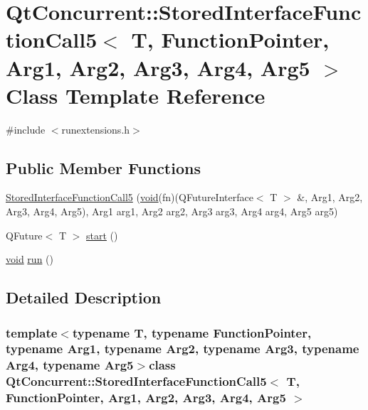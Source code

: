 \hypertarget{class_qt_concurrent_1_1_stored_interface_function_call5}{\section{\-Qt\-Concurrent\-:\-:\-Stored\-Interface\-Function\-Call5$<$ \-T, \-Function\-Pointer, \-Arg1, \-Arg2, \-Arg3, \-Arg4, \-Arg5 $>$ \-Class \-Template \-Reference}
\label{class_qt_concurrent_1_1_stored_interface_function_call5}
}


{\ttfamily \#include $<$runextensions.\-h$>$}

\subsection*{\-Public \-Member \-Functions}
\begin{DoxyCompactItemize}
\item 
\hyperlink{class_qt_concurrent_1_1_stored_interface_function_call5_a60ed5a2b7e65aab39d96f7603428018c}{\-Stored\-Interface\-Function\-Call5} (\hyperlink{group___u_a_v_objects_plugin_ga444cf2ff3f0ecbe028adce838d373f5c}{void}(fn)(\-Q\-Future\-Interface$<$ \-T $>$ \&, \-Arg1, \-Arg2, \-Arg3, \-Arg4, \-Arg5), \-Arg1 arg1, \-Arg2 arg2, \-Arg3 arg3, \-Arg4 arg4, \-Arg5 arg5)
\item 
\-Q\-Future$<$ \-T $>$ \hyperlink{class_qt_concurrent_1_1_stored_interface_function_call5_a6d8a8131da8d0eab30218be1a9d19fe0}{start} ()
\item 
\hyperlink{group___u_a_v_objects_plugin_ga444cf2ff3f0ecbe028adce838d373f5c}{void} \hyperlink{class_qt_concurrent_1_1_stored_interface_function_call5_ac8c29b11a62b5652dcf74f9e7fbe9235}{run} ()
\end{DoxyCompactItemize}


\subsection{\-Detailed \-Description}
\subsubsection*{template$<$typename T, typename Function\-Pointer, typename Arg1, typename Arg2, typename Arg3, typename Arg4, typename Arg5$>$class Qt\-Concurrent\-::\-Stored\-Interface\-Function\-Call5$<$ T, Function\-Pointer, Arg1, Arg2, Arg3, Arg4, Arg5 $>$}




